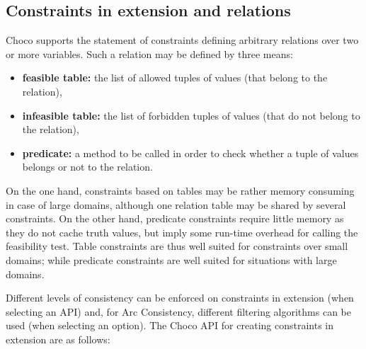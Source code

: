 
\subsection{Constraints in extension and relations}\label{model:arbitraryconstraintsinextension}\hypertarget{model:arbitraryconstraintsinextension}{}
Choco supports the statement of constraints defining arbitrary relations over two or more variables.
Such a relation may be defined by three means:
\begin{itemize}
	\item \textbf{feasible table:} the list of allowed tuples of values (that belong to the relation),
	\item \textbf{infeasible table:} the list of forbidden tuples of values (that do not belong to the relation),
	\item \textbf{predicate:} a method to be called in order to check whether a tuple of values belongs or not to the relation.
\end{itemize}
On the one hand, constraints based on tables may be rather memory consuming in case of large domains, although one relation table may be shared by several constraints. On the other hand, predicate constraints require little memory as they do not cache truth values, but imply some run-time overhead for calling the feasibility test. Table constraints are thus well suited for constraints over small domains; while predicate constraints are well suited for situations with large domains. 

Different levels of consistency can be enforced on constraints in extension (when selecting an API) and, for Arc Consistency, different filtering algorithms can be used (when selecting an option).
The Choco API for creating constraints in extension are as follows:


